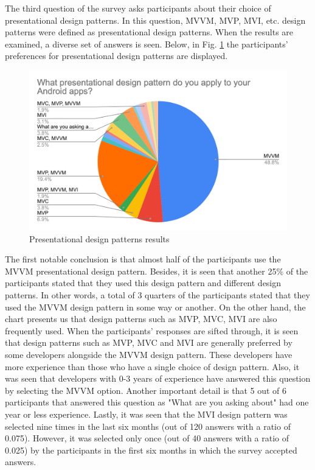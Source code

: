 The third question of the survey asks participants about their choice of presentational design patterns. In this question, MVVM, MVP, MVI, etc. design patterns were defined as presentational design patterns. When the results are  examined, a diverse set of answers is seen. Below, in Fig. \ref{fig:design_pattern} the participants' preferences for presentational design patterns are displayed.
\begin{figure}[ht!]
    \centering
    \includegraphics[scale=0.3]{figures/survey_q3_design_pattern.png}
    \caption{Presentational design patterns results}
    \label{fig:design_pattern}
\end{figure}
\FloatBarrier
The first notable conclusion is that almost half of the participants use the MVVM presentational design pattern. Besides, it is seen that another 25\% of the participants stated that they used this design pattern and different design patterns. In other words, a total of 3 quarters of the participants stated that they used the MVVM design pattern in some way or another. On the other hand, the chart presents us that design patterns such as MVP, MVC, MVI are also frequently used. When the participants' responses are sifted through, it is seen that design patterns such as MVP, MVC and MVI are generally preferred by some developers alongside the MVVM design pattern. These developers have more experience than those who have a single choice of design pattern. Also, it was seen that developers with 0-3 years of experience have answered this question by selecting the MVVM option. Another important detail is that 5 out of 6 participants that answered this question as "What are you asking about" had one year or less experience. Lastly, it was seen that the MVI design pattern was selected nine times in the last six months (out of 120 answers with a ratio of 0.075). However, it was selected only once (out of 40 answers with a ratio of 0.025) by the participants in the first six months in which the survey accepted answers.


